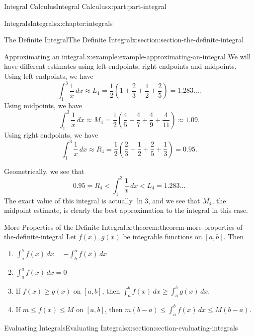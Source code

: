 \documentclass[twoside,10pt,]{tufte-book}
\numberwithin{equation}{part}
\begin{document}
\begin{partptx}{Integral Calculus}{}{Integral Calculus}{}{}{x:part:part-integral}
\begin{chapterptx}{Integrals}{}{Integrals}{}{}{x:chapter:integrals}
\begin{sectionptx}{The Definite Integral}{}{The Definite Integral}{}{}{x:section:section-the-definite-integral}
\begin{example}{Approximating an integral.}{x:example:example-approximating-an-integral}
We will have different estimates using left endpoints, right endpoints and midpoints. Using left endpoints, we have%
\begin{equation*}
\int_{1}^{3}\frac{1}{x}\,dx \approx L_{4} = \frac{1}{2}\left(1 + \frac{2}{3} + \frac{1}{2} + \frac{2}{5}\right) = 1.283....
\end{equation*}
Using midpoints, we have%
\begin{equation*}
\int_{1}^{3}\frac{1}{x}\,dx \approx M_{4} = \frac{1}{2}\left(\frac{4}{5} + \frac{4}{7} + \frac{4}{9} + \frac{4}{11}\right) \approx1.09.
\end{equation*}
Using right endpoints, we have%
\begin{equation*}
\int_{1}^{3}\frac{1}{x}\,dx \approx R_{4} = \frac{1}{2}\left(\frac{2}{3} + \frac{1}{2} + \frac{2}{5} + \frac{1}{3}\right) = 0.95.
\end{equation*}
%
\par
Geometrically, we see that%
\begin{equation*}
0.95 = R_{4} < \int_{1}^{3}\frac{1}{x}\,dx < L_{4} = 1.283...
\end{equation*}
The exact value of this integral is actually \(\ln 3\), and we see that \(M_{4}\), the midpoint estimate, is clearly the best approximation to the integral in this case.%
\end{example}
\begin{theorem}{More Properties of the Definite Integral.}{}{x:theorem:theorem-more-properties-of-the-definite-integral}%
Let \(f(x),g(x)\) be integrable functions on \([a,b]\). Then%
\begin{enumerate}
\item{}\(\displaystyle \int_{a}^{b}f(x)\,dx = - \int_{b}^{a}f(x)\,dx\)%
\item{}\(\displaystyle \int_{a}^{a}f(x)\,dx = 0\)%
\item{}If \(f(x)\geq g(x)\) on \([a,b]\), then \(\int_{a}^{b}f(x)\,dx \geq \int_{a}^{b}g(x)\,dx\).%
\item{}If \(m\leq f(x)\leq M\) on \([a,b]\), then \(m(b-a)\leq \int_{a}^{b}f(x)\,dx\leq M(b-a)\).%
\end{enumerate}
%
\end{theorem}
\end{sectionptx}
%
%
\typeout{************************************************}
\typeout{************************************************}
%
\begin{sectionptx}{Evaluating Integrals}{}{Evaluating Integrals}{}{}{x:section:section-evaluating-integrals}

\end{sectionptx}
\end{chapterptx}
\end{partptx}
\end{document}

